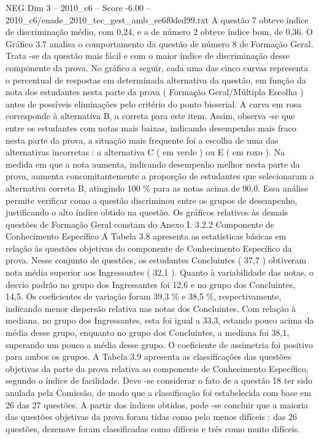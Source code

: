 \begin{textsample}{NEG Dim 3 – 2010\_c6 – Score -6.00 – 2010\_c6/enade\_2010\_tec\_gest\_amb\_ee6f0ded99.txt}
A questão 7 obteve índice de discriminação médio, com 0,24, e a de número 2 obteve índice bom, de 0,36.
O Gráfico 3.7 analisa o comportamento da questão de número 8 de Formação Geral.
Trata -se da questão mais fácil e com o maior índice de discriminação desse componente da prova.
No gráfico a seguir, cada uma das cinco curvas representa o percentual de respostas em determinada alternativa da questão, em função da nota dos estudantes nesta parte da prova ( Formação Geral/Múltipla Escolha ) antes de possíveis eliminações pelo critério do ponto bisserial.
A curva em rosa corresponde à alternativa B, a correta para este item.
Assim, observa -se que entre os estudantes com notas mais baixas, indicando desempenho mais fraco nesta parte da prova, a situação mais frequente foi a escolha de uma das alternativas incorretas : a alternativa C ( em verde ) ou E ( em roxo ).
Na medida em que a nota aumenta, indicando desempenho melhor nesta parte da prova, aumenta concomitantemente a proporção de estudantes que selecionaram a alternativa correta B, atingindo 100 \% para as notas acima de 90,0.
Essa análise permite verificar como a questão discriminou entre os grupos de desempenho, justificando o alto índice obtido na questão.
Os gráficos relativos às demais questões de Formação Geral constam do Anexo I. 3.2.2 Componente de Conhecimento Específico A Tabela 3.8 apresenta as estatísticas básicas em relação às questões objetivas do componente de Conhecimento Específico da prova.
Nesse conjunto de questões, os estudantes Concluintes ( 37,7 ) obtiveram nota média superior aos Ingressantes ( 32,1 ).
Quanto à variabilidade das notas, o desvio padrão no grupo dos Ingressantes foi 12,6 e no grupo dos Concluintes, 14,5.
Os coeficientes de variação foram 39,3 \% e 38,5 \%, respectivamente, indicando menor dispersão relativa nas notas dos Concluintes.
Com relação à mediana, no grupo dos Ingressantes, esta foi igual a 33,3, estando pouco acima da média desse grupo, enquanto no grupo dos Concluintes, a mediana foi 38,1, superando um pouco a média desse grupo.
O coeficiente de assimetria foi positivo para ambos os grupos.
A Tabela 3.9 apresenta as classificações das questões objetivas da parte da prova relativa ao componente de Conhecimento Específico, segundo o índice de facilidade.
Deve -se considerar o fato de a questão 18 ter sido anulada pela Comissão, de modo que a classificação foi estabelecida com base em 26 das 27 questões.
A partir dos índices obtidos, pode -se concluir que a maioria das questões objetivas da prova foram tidas como pelo menos difíceis : das 26 questões, dezenove foram classificadas como difíceis e três como muito difíceis.

\end{textsample}
